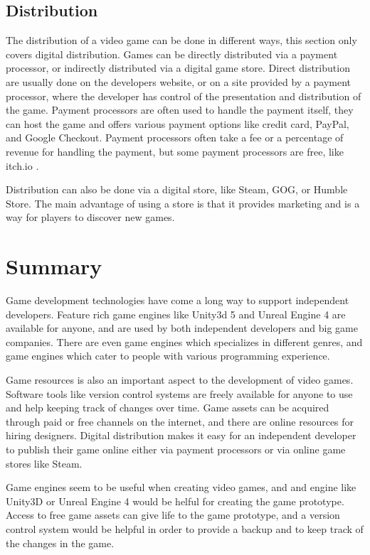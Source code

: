 \subsection{Distribution}
The distribution of a video game can be done in different ways, this section only covers digital distribution. Games can be directly distributed via a payment processor, or indirectly distributed via a digital game store. Direct distribution are usually done on the developers website, or on a site provided by a payment processor, where the developer has control of the presentation and distribution of the game. Payment processors are often used to handle the payment itself, they can host the game and offers various payment options like credit card, PayPal, and Google Checkout. Payment processors often take a fee or a percentage of revenue for handling the payment, but some payment processors are free, like itch.io \cite{itchio2016payment}.

Distribution can also be done via a digital store, like Steam, GOG, or Humble Store. The main advantage of using a store is that it provides marketing and is a way for players to discover new games.

\section{Summary}
Game development technologies have come a long way to support independent developers. Feature rich game engines like Unity3d 5 and Unreal Engine 4 are available for anyone, and are used by both independent developers and big game companies. There are even game engines which specializes in different genres, and game engines which cater to people with various programming experience.

Game resources is also an important aspect to the development of video games. Software tools like version control systems are freely available for anyone to use and help keeping track of changes over time. Game assets can be acquired through paid or free channels on the internet, and there are online resources for hiring designers. Digital distribution makes it easy for an independent developer to publish their game online either via payment processors or via online game stores like Steam.

Game engines seem to be useful when creating video games, and and engine like Unity3D or Unreal Engine 4 would be helful for creating the game prototype. Access to free game assets can give life to the game prototype, and a version control system would be helpful in order to provide a backup and to keep track of the changes in the game.
